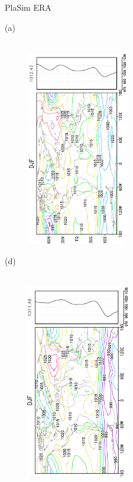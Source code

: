 \documentclass[12pt,a4paper,twoside,openright,headinclude,liststotoc,bibtotoc]{scrreprt}
\begin{document}
\begin{figure}[H]
\hspace{3.0cm}PlaSim \vspace{0.1cm}\hspace{7.2cm} ERA \\
\parbox{8.5cm}{\hspace{0.50cm}\begin{scriptsize}(a)\end{scriptsize} \vspace{-0.7cm} \\
\includegraphics[height=8.5cm,width=6.5cm,angle=-90]
{eps/zonalfinalysmpres151DJF.eps}
}
\parbox{8.5cm}{\hspace{0.25cm}\begin{scriptsize}(d)\end{scriptsize} \vspace{-0.7cm} \\
\includegraphics[height=8.5cm,width=6.5cm,angle=-90]
{eps/zonalt21finalysmmslpDJF.eps}
}
\end{figure}
\end{document}
